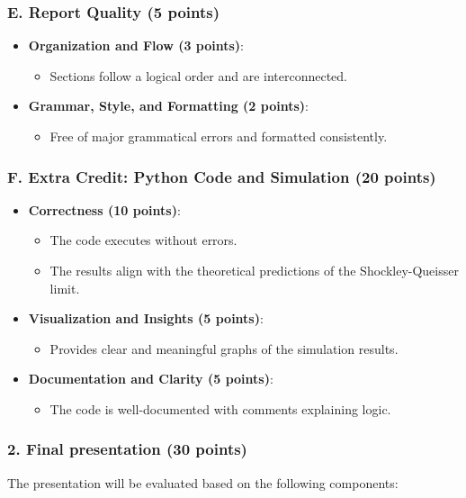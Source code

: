 \documentclass[11pt]{article}
\begin{document}
\subsubsection*{E. Report Quality (5 points)}
\begin{itemize}
    \item \textbf{Organization and Flow (3 points)}:
    \begin{itemize}
        \item Sections follow a logical order and are interconnected.
    \end{itemize}
    \item \textbf{Grammar, Style, and Formatting (2 points)}:
    \begin{itemize}
        \item Free of major grammatical errors and formatted consistently.
    \end{itemize}
\end{itemize}

\subsubsection*{F. Extra Credit: Python Code and Simulation (20 points)}
\begin{itemize}
    \item \textbf{Correctness (10 points)}:
    \begin{itemize}
        \item The code executes without errors.
        \item The results align with the theoretical predictions of the Shockley-Queisser limit.
    \end{itemize}
    \item \textbf{Visualization and Insights (5 points)}:
    \begin{itemize}
        \item Provides clear and meaningful graphs of the simulation results.
    \end{itemize}
    \item \textbf{Documentation and Clarity (5 points)}:
    \begin{itemize}
        \item The code is well-documented with comments explaining logic.
    \end{itemize}
\end{itemize}

\subsubsection*{2. Final presentation (30 points)}
The presentation will be evaluated based on the following components:
\end{document}
